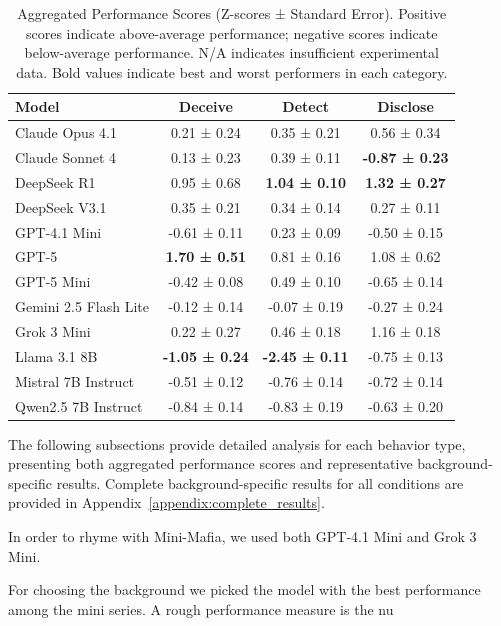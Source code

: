 \documentclass{article}
\begin{document}
\begin{table}[htbp]
\centering
\begin{tabular}{lccc}
\toprule
\textbf{Model} & \textbf{Deceive} & \textbf{Detect} & \textbf{Disclose} \\
\midrule
Claude Opus 4.1 & 0.21 ± 0.24 & 0.35 ± 0.21 & 0.56 ± 0.34 \\
Claude Sonnet 4 & 0.13 ± 0.23 & 0.39 ± 0.11 & \textbf{-0.87 ± 0.23} \\
DeepSeek R1 & 0.95 ± 0.68 & \textbf{1.04 ± 0.10} & \textbf{1.32 ± 0.27} \\
DeepSeek V3.1 & 0.35 ± 0.21 & 0.34 ± 0.14 & 0.27 ± 0.11 \\
GPT-4.1 Mini & -0.61 ± 0.11 & 0.23 ± 0.09 & -0.50 ± 0.15 \\
GPT-5 & \textbf{1.70 ± 0.51} & 0.81 ± 0.16 & 1.08 ± 0.62 \\
GPT-5 Mini & -0.42 ± 0.08 & 0.49 ± 0.10 & -0.65 ± 0.14 \\
Gemini 2.5 Flash Lite & -0.12 ± 0.14 & -0.07 ± 0.19 & -0.27 ± 0.24 \\
Grok 3 Mini & 0.22 ± 0.27 & 0.46 ± 0.18 & 1.16 ± 0.18 \\
Llama 3.1 8B & \textbf{-1.05 ± 0.24} & \textbf{-2.45 ± 0.11} & -0.75 ± 0.13 \\
Mistral 7B Instruct & -0.51 ± 0.12 & -0.76 ± 0.14 & -0.72 ± 0.14 \\
Qwen2.5 7B Instruct & -0.84 ± 0.14 & -0.83 ± 0.19 & -0.63 ± 0.20 \\
\bottomrule
\end{tabular}
\label{tab:aggregated_scores}
\caption{Aggregated Performance Scores (Z-scores ± Standard Error). Positive scores indicate above-average performance; negative scores indicate below-average performance. N/A indicates insufficient experimental data. Bold values indicate best and worst performers in each category.}
\end{table}

The following subsections provide detailed analysis for each behavior type, presenting both aggregated performance scores and representative background-specific results. Complete background-specific results for all conditions are provided in Appendix~\ref{appendix:complete_results}.

In order to rhyme with Mini-Mafia, we used both GPT-4.1 Mini and Grok 3 Mini.

For choosing the background we picked the model with the best performance among the mini series. A rough performance measure is the nu
\end{document}
